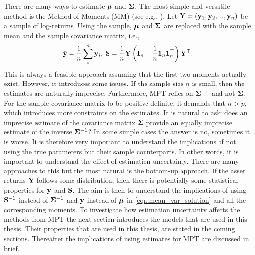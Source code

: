 \documentclass[12pt, oneside]{book}\usepackage{knitr}
\begin{document}
There are many ways to estimate $\mbox{\boldmath$\mu$}$ and $\mathbf{\Sigma}$.
The most simple and versatile method is the Method of Moments (MM) (see e.g., \citet[ch. 9]{wasserman2004all}). 
Let $\mathbf{Y} = (\mathbf{y}_1, \mathbf{y}_2, ..., \mathbf{y}_n)$ be a sample of log-returns.
Using the sample, $\mbox{\boldmath$\mu$}$ and $\mathbf{\Sigma}$ are replaced with the sample mean and the sample covariance matrix, i.e.,
$$
\bar{\mathbf{y}} = \frac{1}{n} \sum_i^n \mathbf{y}_i, \; \mathbf{S} = \frac{1}{n}\mathbf{Y} \left(\mathbf{I}_n - \frac{1}{n} \mathbf{1}_n \mathbf{1}_n^\top \right) \mathbf{Y}^\top.
$$
This is always a feasible approach assuming that the first two moments actually exist. 
However, it introduces some issues.
If the sample size $n$ is small, then the estimates are naturally imprecise.
Furthermore, MPT relies on $\mathbf{\Sigma}^{-1}$ and not $\mathbf{\Sigma}$.
For the sample covariance matrix to be positive definite, it demands that $n>p$, which introduces more constraints on the estimates.
It is natural to ask: does an imprecise estimate of the covariance matrix $\mathbf{\Sigma}$ provide an equally imprecise estimate of the inverse $\mathbf{\Sigma}^{-1}$?
In some simple cases the answer is no, sometimes it is worse. 
It is therefore very important to understand the implications of not using the true parameters but their sample counterparts.
In other words, it is important to understand the effect of estimation uncertainty.
There are many approaches to this but the most natural is the bottom-up approach. 
If the asset returns $\mathbf{Y}$ follows some distribution, then there is potentially some statistical properties for $\bar{\mathbf{y}}$ and $\mathbf{S}$.
The aim is then to understand the implications of using $\mathbf{S}^{-1}$ instead of $\mathbf{\Sigma}^{-1}$ and $\bar{\mathbf{y}}$ instead of $\mbox{\boldmath$\mu$}$ in \eqref{eqn:mean_var_solution} and all the corresponding moments.
To investigate how estimation uncertainty affects the methods from MPT the next section introduces the models that are used in this thesis.
Their properties that are used in this thesis, are stated in the coming sections.
Thereafter the implications of using estimates for MPT are discussed in brief.
\end{document}
